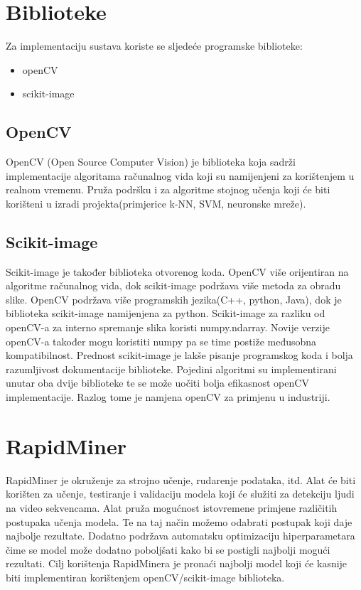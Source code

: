 \documentclass[times, utf8, seminar, numeric]{fer}
\begin{document}
\section{Biblioteke} 
Za implementaciju sustava koriste se sljedeće programske biblioteke:
\begin{itemize} 
	\item openCV
	\item scikit-image
\end{itemize}

\subsection{OpenCV}
OpenCV (Open Source Computer Vision) je biblioteka koja sadrži implementacije algoritama računalnog vida koji su namijenjeni za korištenjem u realnom vremenu. Pruža podršku i za algoritme stojnog učenja koji će biti korišteni u izradi projekta(primjerice k-NN, SVM, neuronske mreže). 

\subsection{Scikit-image}
Scikit-image je također biblioteka otvorenog koda. OpenCV više orijentiran na algoritme računalnog vida, dok scikit-image podržava više metoda za obradu slike. OpenCV podržava više programskih jezika(C++, python, Java), dok je biblioteka scikit-image namijenjena za python. Scikit-image za razliku od openCV-a za interno spremanje slika koristi numpy.ndarray. Novije verzije openCV-a također mogu koristiti numpy pa se time postiže međusobna kompatibilnost. Prednost scikit-image je lakše pisanje programskog koda i bolja razumljivost dokumentacije biblioteke. Pojedini algoritmi su implementirani unutar oba dvije biblioteke te se može uočiti bolja efikasnost openCV implementacije. Razlog tome je namjena openCV za primjenu u industriji.


\section{RapidMiner} 
RapidMiner je okruženje za strojno učenje, rudarenje podataka, itd. Alat će biti korišten za učenje, testiranje i validaciju modela koji će služiti za detekciju ljudi na video sekvencama. Alat pruža mogućnost istovremene primjene različitih postupaka učenja modela. Te na taj način možemo odabrati postupak koji daje najbolje rezultate. Dodatno podržava automatsku optimizaciju hiperparametara čime se model može dodatno poboljšati kako bi se postigli najbolji mogući rezultati. Cilj korištenja RapidMinera je pronaći najbolji model koji će kasnije biti implementiran korištenjem openCV/scikit-image biblioteka. 
\end{document}
